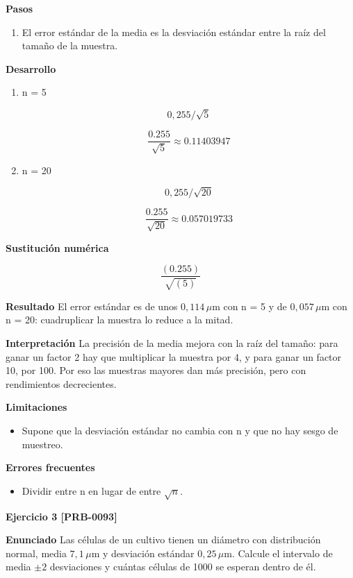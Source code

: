 \documentclass{book}
\begin{document}
\noindent\textbf{Pasos}
\begin{enumerate}
\item
El error estándar de la media es la desviación estándar entre la raíz del tamaño de la muestra.

\end{enumerate}

\noindent\textbf{Desarrollo}
\begin{enumerate}
\item
n = 5


\[
0,255/\sqrt{5}
\]

\[
\frac{0.255}{\sqrt{5}} \approx 0.11403947
\]
\item
n = 20


\[
0,255/\sqrt{20}
\]

\[
\frac{0.255}{\sqrt{20}} \approx 0.057019733
\]
\end{enumerate}

\noindent\textbf{Sustitución numérica}

\[
\frac{\left(0.255\right)}{\sqrt{\left(5\right)}}
\]

\noindent\textbf{Resultado}
El error estándar es de unos \(0{,}114\,\mu\mathrm{m}\) con n = 5 y de \(0{,}057\,\mu\mathrm{m}\) con n = 20: cuadruplicar la muestra lo reduce a la mitad.


\noindent\textbf{Interpretación}
La precisión de la media mejora con la raíz del tamaño: para ganar un factor 2 hay que multiplicar la muestra por 4, y para ganar un factor 10, por 100. Por eso las muestras mayores dan más precisión, pero con rendimientos decrecientes.


\noindent\textbf{Limitaciones}
\begin{itemize}
\item Supone que la desviación estándar no cambia con n y que no hay sesgo de muestreo.
\end{itemize}

\noindent\textbf{Errores frecuentes}
\begin{itemize}
\item Dividir entre n en lugar de entre \(\sqrt{n}\).
\end{itemize}

\noindent\textbf{Ejercicio 3 [PRB-0093]}

\noindent\textbf{Enunciado}
Las células de un cultivo tienen un diámetro con distribución normal, media \(7{,}1\,\mu\mathrm{m}\) y desviación estándar \(0{,}25\,\mu\mathrm{m}\). Calcule el intervalo de media \(\pm 2\) desviaciones y cuántas células de 1000 se esperan dentro de él.
\end{document}
